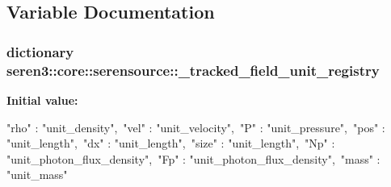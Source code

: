 \subsection{Variable Documentation}
\hypertarget{namespaceseren3_1_1core_1_1serensource_af986ba2dbc807cd868eb9121d1cfd5a1}{
\subsubsection[{\_\-tracked\_\-field\_\-unit\_\-registry}]{\setlength{\rightskip}{0pt plus 5cm}dictionary seren3::core::serensource::\_\-tracked\_\-field\_\-unit\_\-registry}}
\label{namespaceseren3_1_1core_1_1serensource_af986ba2dbc807cd868eb9121d1cfd5a1}
{\bfseries Initial value:}
\begin{DoxyCode}
{"rho" : "unit_density",\
                                "vel" : "unit_velocity",\
                                "P" : "unit_pressure",\
                                "pos" : "unit_length",\
                                "dx" : "unit_length",\
                                "size" : "unit_length",\
                                "Np" : "unit_photon_flux_density",\
                                "Fp" : "unit_photon_flux_density",\
                                "mass" : "unit_mass"}
\end{DoxyCode}
